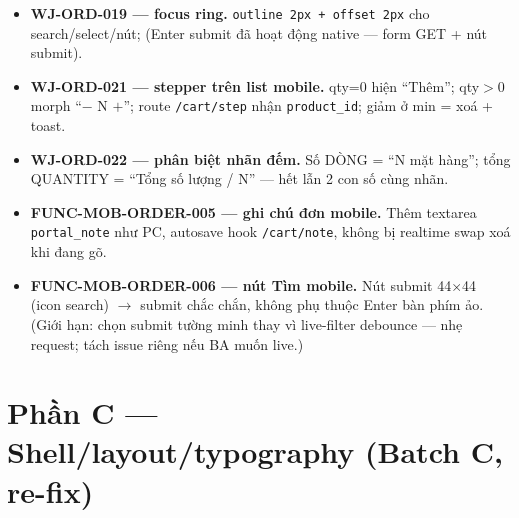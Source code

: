 \begin{itemize}
    phải hẹp $\to$ không đẩy body cuộn ngang (1440$\times$900).
  \item \textbf{WJ-ORD-019 --- focus ring.} \texttt{outline 2px + offset 2px} cho search/select/nút;
    (Enter submit đã hoạt động native --- form GET + nút submit).
  \item \textbf{WJ-ORD-021 --- stepper trên list mobile.} qty=0 hiện ``Thêm''; qty$>$0 morph
    ``$-$ N $+$''; route \texttt{/cart/step} nhận \texttt{product\_id}; giảm ở min = xoá + toast.
  \item \textbf{WJ-ORD-022 --- phân biệt nhãn đếm.} Số DÒNG = ``N mặt hàng''; tổng QUANTITY =
    ``Tổng số lượng / N'' --- hết lẫn 2 con số cùng nhãn.
  \item \textbf{FUNC-MOB-ORDER-005 --- ghi chú đơn mobile.} Thêm textarea \texttt{portal\_note} như PC,
    autosave hook \texttt{/cart/note}, không bị realtime swap xoá khi đang gõ.
  \item \textbf{FUNC-MOB-ORDER-006 --- nút Tìm mobile.} Nút submit 44$\times$44 (icon search) $\to$ submit
    chắc chắn, không phụ thuộc Enter bàn phím ảo. (Giới hạn: chọn submit tường minh thay vì live-filter
    debounce --- nhẹ request; tách issue riêng nếu BA muốn live.)
\end{itemize}

\section{Phần C --- Shell/layout/typography (Batch C, re-fix)}

